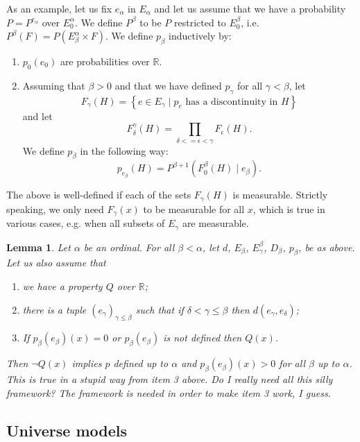 \documentclass[a4paper
,draft
]{article}
\def\reale{\mathbb{R}}
\newcommand{\multime}[1]{\left\{ #1 \right\}}
\newtheorem{lemma}{Lemma}
\begin{document}
As an example, let us fix $e_\alpha$ in $E_\alpha$ and let us assume that we
have a probability $P = P^{e_\alpha}$ over $E^\alpha_0$. We
define $P^\beta$ to be $P$ restricted to
$E^\beta_0$, i.e. $P^\beta(F) = P(E^\alpha_\beta \times F)$.
We define $p_\beta$ inductively by:
\begin{enumerate}
  \item $p_0(e_0)$ are probabilities over $\reale$.
  \item Assuming that $\beta > 0$ and that we have defined $p_\gamma$
        for all $\gamma < \beta$, let
        $$F_\gamma(H) =
          \multime{e\in E_\gamma
            \mid p_e \mbox { has a discontinuity in }H}$$
        and let
        $$F^\gamma_\delta(H)
          = \prod_{\delta <= \epsilon < \gamma}F_\epsilon(H).$$
        We define $p_{\beta}$ in the following way:
        $$p_{e_{\beta}}(H) =
          P^{\beta + 1}(F^{\beta}_0(H) \mid e_{\beta}).$$
\end{enumerate}
The above is well-defined if each of the sets $F_\gamma(H)$ is
measurable. Strictly speaking, we only need $F_\gamma(x)$ to be measurable for
all $x$, which is true in various cases, e.g. when all subsets of $E_\gamma$ are
measurable.

\begin{lemma}
  Let $\alpha$ be an ordinal. For all $\beta < \alpha$, let $d$,
  $E_\beta$, $E^\beta_\gamma$, $D_\beta$,
  $p_\beta$, be as above. Let us also assume that
  \begin{enumerate}
    \item we have a property $Q$ over $\reale$;
    \item there is a tuple $(e_\gamma)_{\gamma \le \beta}$ such that if
          $\delta < \gamma \le \beta$ then $d(e_\gamma, e_\delta)$;
    \item If $p_\beta(e_\beta)(x) = 0$ or $p_\beta(e_\beta)$ is not defined
          then $Q(x)$.
  \end{enumerate}

  Then $\neg Q(x)$ implies $p$ defined up to $\alpha$ and
  $p_\beta(e_\beta)(x) > 0$ for all $\beta$ up to $\alpha$.
\proof
  This is true in a stupid way from item 3 above. Do I really need all this
  silly framework? The framework is needed in order to make item 3 work,
  I guess.
\end{lemma}


\subsection{Universe models}
\end{document}
